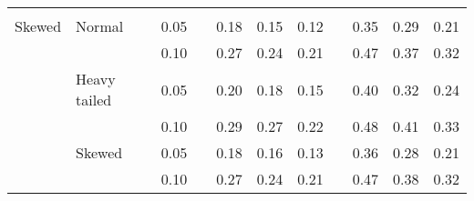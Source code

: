 \begin{table}[ht]
\begin{scriptsize}
\begin{tabular}{ll p{.1cm} c p{.1cm} rrr p{.1cm} rrr}
             &&&&&&&&&&&\\
Skewed       & Normal       && 0.05 &&  0.18 & 0.15 & 0.12 && 0.35 & 0.29 & 0.21 \\ 
             &              && 0.10 &&  0.27 & 0.24 & 0.21 && 0.47 & 0.37 & 0.32 \\ 
             & Heavy tailed && 0.05 &&  0.20 & 0.18 & 0.15 && 0.40 & 0.32 & 0.24 \\ 
             &              && 0.10 &&  0.29 & 0.27 & 0.22 && 0.48 & 0.41 & 0.33 \\ 
             & Skewed       && 0.05 &&  0.18 & 0.16 & 0.13 && 0.36 & 0.28 & 0.21 \\ 
             &              && 0.10 &&  0.27 & 0.24 & 0.21 && 0.47 & 0.38 & 0.32 \\ 

\hline
\end{tabular}
\end{scriptsize}
\end{table}


